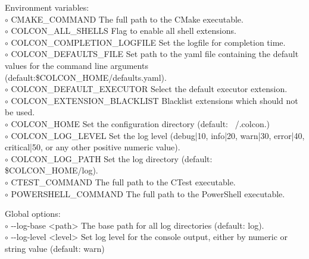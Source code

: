\documentclass[9pt,a4paper]{article}
\newcommand{\textangles}[1]{\textless #1\textgreater}
\newcommand{\smallhspace}{\-\hspace{0.3cm}}
\newcommand{\terminalfont}[1]{{\sffamily#1}}
\newcommand{\ddash}{-{}-}
\begin{document}
\begin{multicols*}{3}[]
Environment variables:\\
%
$\circ$ \terminalfont{CMAKE\_COMMAND}
\smallhspace
The full path to the CMake executable.                                    \\
%
$\circ$ \terminalfont{COLCON\_ALL\_SHELLS}
\smallhspace
Flag to enable all shell extensions.                                      \\
%
$\circ$ \terminalfont{COLCON\_COMPLETION\_LOGFILE}
\smallhspace
Set the logfile for completion time.                                      \\
%
$\circ$ \terminalfont{COLCON\_DEFAULTS\_FILE}
\smallhspace
Set path to the yaml file containing the default values for
the command line arguments (default:\$COLCON\_HOME/defaults.yaml).        \\
%
$\circ$ \terminalfont{COLCON\_DEFAULT\_EXECUTOR}
\smallhspace
Select the default executor extension.                                    \\
%
$\circ$ \terminalfont{COLCON\_EXTENSION\_BLACKLIST}
\smallhspace
Blacklist extensions which should not be used.                            \\
%
$\circ$ \terminalfont{COLCON\_HOME}
\smallhspace
Set the configuration directory (default: ~/.colcon.)                     \\
%
$\circ$ \terminalfont{COLCON\_LOG\_LEVEL}
\smallhspace
Set the log level (debug|10, info|20, warn|30, error|40, critical|50,
or any other positive numeric value).                                     \\
%
$\circ$ \terminalfont{COLCON\_LOG\_PATH}
\smallhspace
Set the log directory (default: \$COLCON\_HOME/log).                      \\
%
$\circ$ \terminalfont{CTEST\_COMMAND}
\smallhspace
The full path to the CTest executable.                                    \\
%
$\circ$ \terminalfont{POWERSHELL\_COMMAND}
\smallhspace
The full path to the PowerShell executable.
%
%

\hrulefill

Global options:\\
%
$\circ$ \terminalfont{\ddash log-base \textangles{path}}
The base path for all log directories (default: log). \\
%
$\circ$ \terminalfont{\ddash log-level \textangles{level}}
Set log level for the console output, either by numeric or string value (default: warn)


\end{multicols*}
\end{document}
